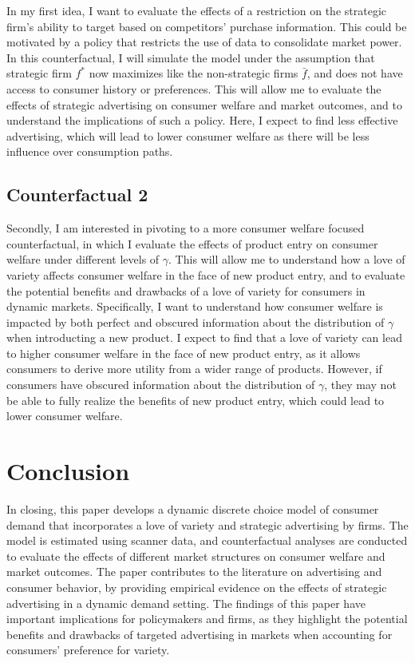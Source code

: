 \documentclass[12pt]{article}
\begin{document}
    In my first idea, I want to evaluate the effects of a restriction on the strategic firm's ability to target based on competitors' purchase information. This could be motivated by a policy that restricts the use of data to consolidate market power. In this counterfactual, I will simulate the model under the assumption that strategic firm $f^*$ now maximizes like the non-strategic firms $\bar{f}$, and does not have access to consumer history or preferences. This will allow me to evaluate the effects of strategic advertising on consumer welfare and market outcomes, and to understand the implications of such a policy. Here, I expect to find less effective advertising, which will lead to lower consumer welfare as there will be less influence over consumption paths.

    \subsection{Counterfactual 2}

    Secondly, I am interested in pivoting to a more consumer welfare focused counterfactual, in which I evaluate the effects of product entry on consumer welfare under different levels of $\gamma$. This will allow me to understand how a love of variety affects consumer welfare in the face of new product entry, and to evaluate the potential benefits and drawbacks of a love of variety for consumers in dynamic markets. Specifically, I want to understand how consumer welfare is impacted by both perfect and obscured information about the distribution of $\gamma$ when introducting a new product. I expect to find that a love of variety can lead to higher consumer welfare in the face of new product entry, as it allows consumers to derive more utility from a wider range of products. However, if consumers have obscured information about the distribution of $\gamma$, they may not be able to fully realize the benefits of new product entry, which could lead to lower consumer welfare.


\section{Conclusion}

In closing, this paper develops a dynamic discrete choice model of consumer demand that incorporates a love of variety and strategic advertising by firms. The model is estimated using scanner data, and counterfactual analyses are conducted to evaluate the effects of different market structures on consumer welfare and market outcomes. The paper contributes to the literature on  advertising and consumer behavior, by providing empirical evidence on the effects of strategic advertising in a dynamic demand setting. The findings of this paper have important implications for policymakers and firms, as they highlight the potential benefits and drawbacks of targeted advertising in markets when accounting for consumers' preference for variety.

\newpage


\end{document}
